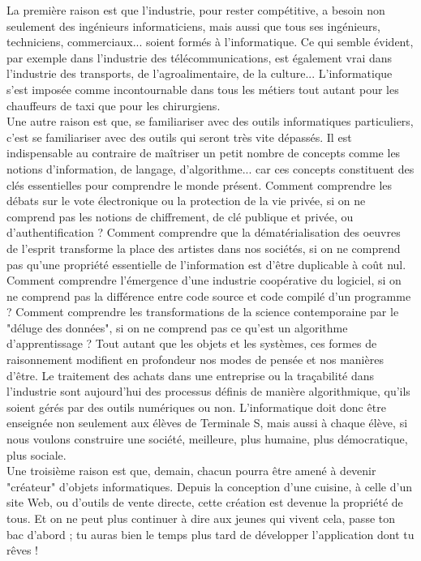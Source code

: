 \documentclass[11pt,twoside,a4paper]{article}
\begin{document}
\begin{multicols}{2}
	La premi{\`e}re raison est que l'industrie, pour rester comp{\'e}titive, a besoin non seulement des ing{\'e}nieurs informaticiens, mais aussi que tous ses ing{\'e}nieurs, techniciens, commerciaux... soient form{\'e}s {\`a} l'informatique. Ce qui semble {\'e}vident, par exemple dans l'industrie des t{\'e}l{\'e}communications, est {\'e}galement vrai dans l'industrie des transports, de l'agroalimentaire, de la culture... L'informatique s'est impos{\'e}e comme incontournable dans tous les m{\'e}tiers tout autant pour les chauffeurs de taxi que pour les chirurgiens.~\\
	
	Une autre raison est que, se familiariser avec des outils informatiques particuliers, c'est se familiariser avec des outils qui seront tr{\`e}s vite d{\'e}pass{\'e}s. Il est indispensable au contraire de ma{\^i}triser un petit nombre de concepts comme les notions d'information, de langage, d'algorithme... car ces concepts constituent des cl{\'e}s essentielles pour comprendre le monde pr{\'e}sent. Comment comprendre les d{\'e}bats sur le vote {\'e}lectronique ou la protection de la vie priv{\'e}e, si on ne comprend pas les notions de chiffrement, de cl{\'e} publique et priv{\'e}e, ou d'authentification ? Comment comprendre que la d{\'e}mat{\'e}rialisation des oeuvres de l'esprit transforme la place des artistes dans nos soci{\'e}t{\'e}s, si on ne comprend pas qu'une propri{\'e}t{\'e} essentielle de l'information est d'{\^e}tre duplicable {\`a} co{\^u}t nul. Comment comprendre l'{\'e}mergence d'une industrie coop{\'e}rative du logiciel, si on ne comprend pas la diff{\'e}rence entre code source et code compil{\'e} d'un programme ? Comment comprendre les transformations de la science contemporaine par le "d{\'e}luge des donn{\'e}es", si on ne comprend pas ce qu'est un algorithme d'apprentissage ? Tout autant que les objets et les syst{\`e}mes, ces formes de raisonnement modifient en profondeur nos modes de pens{\'e}e et nos mani{\`e}res d'{\^e}tre. Le traitement des achats dans une entreprise ou la tra\c{c}abilit{\'e} dans l'industrie sont aujourd'hui des processus d{\'e}finis de mani{\`e}re algorithmique, qu'ils soient g{\'e}r{\'e}s par des outils num{\'e}riques ou non. L'informatique doit donc {\^e}tre enseign{\'e}e non seulement aux {\'e}l{\`e}ves de Terminale S, mais aussi {\`a} chaque {\'e}l{\`e}ve, si nous voulons construire une soci{\'e}t{\'e}, meilleure, plus humaine, plus d{\'e}mocratique, plus sociale.~\\
	
	Une troisi{\`e}me raison est que, demain, chacun pourra {\^e}tre amen{\'e} {\`a} devenir "cr{\'e}ateur" d'objets informatiques. Depuis la conception d'une cuisine, {\`a} celle d'un site Web, ou d'outils de vente directe, cette cr{\'e}ation est devenue la propri{\'e}t{\'e} de tous. Et on ne peut plus continuer {\`a} dire aux jeunes qui vivent cela, passe ton bac d'abord ; tu auras bien le temps plus tard de d{\'e}velopper l'application dont tu r{\^e}ves !~\\
	

\end{multicols}
\end{document}
